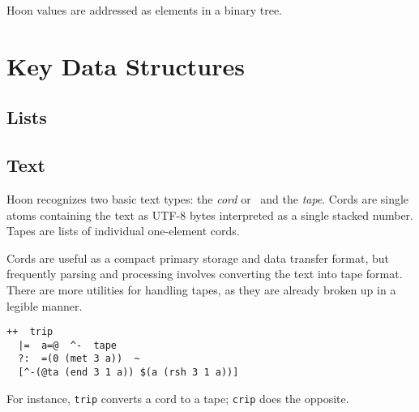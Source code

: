 
Hoon values are addressed as elements in a binary tree.



\section{Key Data Structures}

\subsection{Lists}

\subsection{Text}


Hoon recognizes two basic text types:  the \emph{cord} or \patt~and the \emph{tape}.  Cords are single atoms containing the text as UTF-8 bytes interpreted as a single stacked number.  Tapes are lists of individual one-element cords.


Cords are useful as a compact primary storage and data transfer format, but frequently parsing and processing involves converting the text into tape format.  There are more utilities for handling tapes, as they are already broken up in a legible manner.

\begin{lstlisting}
++  trip
  |=  a=@  ^-  tape
  ?:  =(0 (met 3 a))  ~
  [^-(@ta (end 3 1 a)) $(a (rsh 3 1 a))]
\end{lstlisting}


For instance, \texttt{trip} converts a cord to a tape; \texttt{crip} does the opposite.


